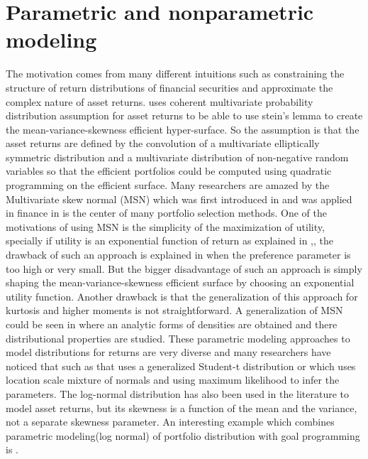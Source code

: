 \documentclass[12pt,a4paper]{article}
\numberwithin{equation}{section}
\begin{document}
\section{Parametric and nonparametric modeling} 
The motivation comes from many different intuitions such as constraining the structure of return distributions of financial securities and approximate the complex nature of asset returns. \citep{Adcock2014} uses coherent multivariate probability distribution assumption for asset returns to be able to use stein’s lemma to create the mean-variance-skewness efficient hyper-surface. So the assumption is that the asset returns are defined by the convolution of a multivariate elliptically symmetric distribution and a multivariate distribution of non-negative random variables so that the efficient portfolios could be computed using quadratic programming on the efficient surface. Many researchers are amazed by the Multivariate skew normal (MSN) which was first introduced in \citep{azzalini1996} and was applied in finance in \citep{Adcock1999} is the center of many portfolio selection methods. One of the motivations of using MSN is the simplicity of the maximization of utility, specially if utility is an exponential function of return as explained in \citep{Adcock2005},\citep{Landsman2019}, the drawback of such an approach is explained in \citep{Adcock2005} when the preference parameter is too high or very small. But the bigger disadvantage of such an approach is simply shaping the mean-variance-skewness efficient surface by choosing an exponential utility function. Another drawback is that the generalization of this approach for kurtosis and higher moments is not straightforward. A generalization of MSN could be seen in \citep{SAHU2003} where an analytic forms of densities are obtained and there distributional properties are studied. These parametric modeling approaches to model distributions for returns are very diverse and many researchers have noticed that such as \citep{Jondeaua2003} that uses a generalized Student-t distribution or \citep{Mencia2009} which uses location scale mixture of normals and using maximum likelihood to infer the parameters. The log-normal distribution has also been used in the literature to model asset returns, but its skewness is a function of the mean and the variance, not a separate skewness parameter. An interesting example which combines parametric modeling(log normal) of portfolio distribution with goal programming is \citep{Changetal2008}. 
\end{document}

